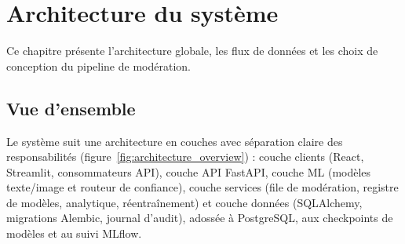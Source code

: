 \chapter{Architecture du système}
\label{ch:architecture}

Ce chapitre présente l'architecture globale, les flux de données et les choix de conception du pipeline de modération.

\section{Vue d'ensemble}

Le système suit une architecture en couches avec séparation claire des responsabilités (figure~\ref{fig:architecture_overview}) : couche clients (React, Streamlit, consommateurs API), couche API FastAPI, couche ML (modèles texte/image et routeur de confiance), couche services (file de modération, registre de modèles, analytique, réentraînement) et couche données (SQLAlchemy, migrations Alembic, journal d'audit), adossée à PostgreSQL, aux checkpoints de modèles et au suivi MLflow.

